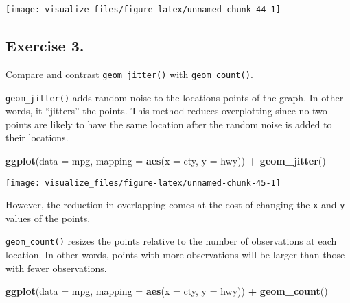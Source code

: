 \documentclass[]{book}
\newenvironment{Shaded}{\begin{snugshade}}{\end{snugshade}}
\newcommand{\DataTypeTok}[1]{\textcolor[rgb]{0.13,0.29,0.53}{#1}}
\newcommand{\KeywordTok}[1]{\textcolor[rgb]{0.13,0.29,0.53}{\textbf{#1}}}
\newcommand{\NormalTok}[1]{#1}
\newcommand{\OperatorTok}[1]{\textcolor[rgb]{0.81,0.36,0.00}{\textbf{#1}}}
\newcommand{\StringTok}[1]{\textcolor[rgb]{0.31,0.60,0.02}{#1}}
\theoremstyle{plain}
\theoremstyle{remark}
\theoremstyle{definition}
\theoremstyle{definition}
\theoremstyle{definition}
\theoremstyle{remark}
\begin{document}
\begin{center}\texttt{[image: visualize\_files/figure-latex/unnamed-chunk-44-1]} \end{center}

\hypertarget{exercise-3.-2}{%
\subsection{Exercise 3.}\label{exercise-3.-2}}

Compare and contrast \texttt{geom\_jitter()} with
\texttt{geom\_count()}.

\texttt{geom\_jitter()} adds random noise to the locations points of the
graph. In other words, it ``jitters'' the points. This method reduces
overplotting since no two points are likely to have the same location
after the random noise is added to their locations.

\begin{Shaded}
\begin{Highlighting}[]
\KeywordTok{ggplot}\NormalTok{(}\DataTypeTok{data =}\NormalTok{ mpg, }\DataTypeTok{mapping =} \KeywordTok{aes}\NormalTok{(}\DataTypeTok{x =}\NormalTok{ cty, }\DataTypeTok{y =}\NormalTok{ hwy)) }\OperatorTok{+}
\StringTok{  }\KeywordTok{geom_jitter}\NormalTok{()}
\end{Highlighting}
\end{Shaded}

\begin{center}\texttt{[image: visualize\_files/figure-latex/unnamed-chunk-45-1]} \end{center}

However, the reduction in overlapping comes at the cost of changing the
\texttt{x} and \texttt{y} values of the points.

\texttt{geom\_count()} resizes the points relative to the number of
observations at each location. In other words, points with more
observations will be larger than those with fewer observations.

\begin{Shaded}
\begin{Highlighting}[]
\KeywordTok{ggplot}\NormalTok{(}\DataTypeTok{data =}\NormalTok{ mpg, }\DataTypeTok{mapping =} \KeywordTok{aes}\NormalTok{(}\DataTypeTok{x =}\NormalTok{ cty, }\DataTypeTok{y =}\NormalTok{ hwy)) }\OperatorTok{+}
\StringTok{  }\KeywordTok{geom_count}\NormalTok{()}
\end{Highlighting}
\end{Shaded}
\end{document}
